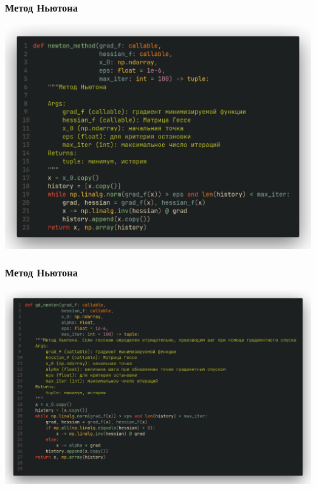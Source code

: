 \documentclass[9pt]{beamer}
\begin{document}
\begin{frame}
    \frametitle{Метод Ньютона}
    \begin{center}
        \includegraphics[width = 1\textwidth]{code_newton.png}
    \end{center}
\end{frame}


\begin{frame}
    \frametitle{Метод Ньютона}
    \begin{center}
        \includegraphics[width = 1\textwidth]{code_newton_2.png}
    \end{center}
\end{frame}
\end{document}
